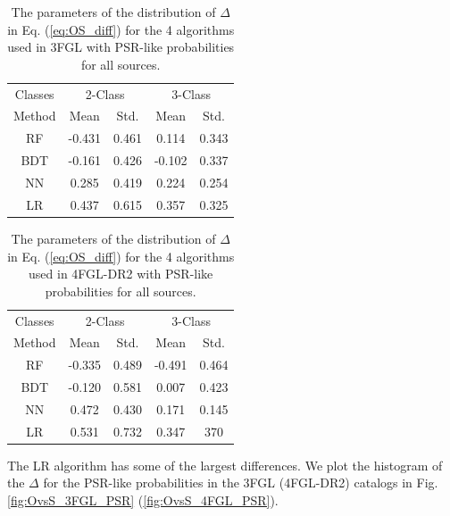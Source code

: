 \begin{table}[!h]
\tiny
\centering
\renewcommand{\tabcolsep}{1mm}
\renewcommand{\arraystretch}{1.3}

\begin{tabular}{c c c c c }
\hline
\hline
Classes&\multicolumn{2}{c}{2-Class}&\multicolumn{2}{c}{3-Class}\\
Method & Mean&Std.&Mean&Std.\\
\hline
RF& -0.431 & 0.461&0.114&0.343\\
\hline
BDT&-0.161&0.426 &-0.102&0.337\\
\hline
NN&0.285&0.419&0.224&0.254\\
\hline
LR&0.437&0.615&0.357&0.325\\
\end{tabular}
\vspace{2mm}
\caption{The parameters of the distribution of $\Delta$ in Eq.  (\ref{eq:OS_diff})
for the 4 algorithms used in 3FGL with PSR-like probabilities for all sources.
}
\label{tab:OvsS_3FGL}
\end{table}





\begin{table}[!h]
\tiny
\centering
\renewcommand{\tabcolsep}{1mm}
\renewcommand{\arraystretch}{1.3}

\begin{tabular}{c c c c c}
\hline
\hline
Classes&\multicolumn{2}{c}{2-Class}&\multicolumn{2}{c}{3-Class}\\
Method & Mean&Std.&Mean&Std.\\
\hline
RF& -0.335 & 0.489&-0.491&0.464\\
\hline
BDT&-0.120&0.581 &0.007&0.423\\
\hline
NN&0.472&0.430&0.171&0.145\\
\hline
LR&0.531&0.732&0.347&370\\
\end{tabular}
\vspace{2mm}
\caption{The parameters of the distribution of $\Delta$ in Eq.  (\ref{eq:OS_diff})
for the 4 algorithms used in 4FGL-DR2 with PSR-like probabilities for all sources.
}
\label{tab:OvsS_4FGL}
\end{table}

The LR algorithm has some of the largest differences.
We plot the histogram of the $\Delta$ for the PSR-like probabilities in the 3FGL (4FGL-DR2) catalogs in Fig. \ref{fig:OvsS_3FGL_PSR}
(\ref{fig:OvsS_4FGL_PSR}).

